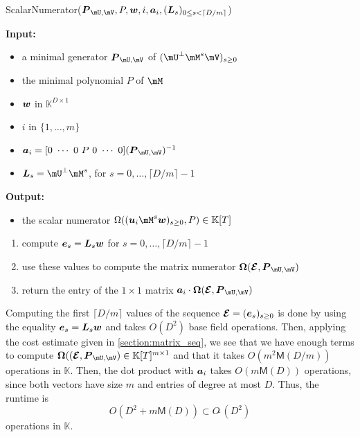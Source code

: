 \documentclass[12pt]{article}
\newcommand{\mat}[1]{\bm{\MakeUppercase{#1}}} %
\newcommand{\row}[1]{\bm{\MakeLowercase{#1}}} %
\newcommand{\col}[1]{\bm{\MakeLowercase{#1}}} %
\newcommand{\softO}[1]{O{\tilde{~}}(#1)} %
\newcommand{\minpoly}{P}
\def\M {\ensuremath{\mathsf{M}}}
\def\K{\mathbb{K}}
\def\K {\ensuremath{\mathbb{K}}}
\begin{document}
\begin{algorithm}[H]
	\caption{ScalarNumerator($\mat{P}_{\mU,\mV}, \minpoly, \row{w}, i, \row{a}_i,(\mat{L}_s)_{0 \le s < \lceil D/m\rceil}$)}
	{\bf Input:} \vspace{-0.5em}
	\begin{itemize}
		\item a minimal generator $\mat{P}_{\mU,\mV}$ of $(\mU^\perp \mM^s \mV)_{s \ge 0}$
    \item the minimal polynomial $P$ of $\mM$
    \item $\row{w}$ in $\K^{D \times 1}$
    \item $i$ in $\{1,\dots,m\}$
    \item $\row{a}_i =  [0~\cdots~0~\minpoly~0~\cdots~0]  (\mat{P}_{\mU,\mV})^{-1} $
		\item $\mat{L}_s = \mU^\perp \mM^s$, for $s=0,\dots,\lceil D/m\rceil-1$
	\end{itemize}
	{\bf Output:}  \vspace{-0.5em}
        \begin{itemize}
        \item         the scalar numerator $\Omega((\row{u}_i \mM^s \col{w})_{s \ge 0}, \minpoly) \in \K[T]$
        \end{itemize}
        \begin{enumerate}[{\bf 1.}]
        \item compute $\col{E}_s = \mat{L}_s \col{w}$ for $s=0,\dots,\lceil D/m\rceil-1$
        \item use these values to compute the matrix numerator $ \mat{\Omega}(\mat{\mathcal{E}}, \mat{P}_{\mU,\mV})$ 
        \item return the entry of the $1 \times 1$ matrix $\row{a}_i\cdot  \mat{\Omega}(\mat{\mathcal{E}}, \mat{P}_{\mU,\mV})$ 
        \end{enumerate}
	\label{algo:scalar_numerator}
\end{algorithm}

Computing the first $\lceil D/m \rceil$ values of the sequence
$\mat{\mathcal{E}}=(\col{e}_s)_{s \ge 0}$ is done by using the
equality $\col{E}_s = \mat{L}_s \col{w}$ and takes $O(D^2)$ base field
operations. Then, applying the cost estimate given in
\cref{section:matrix_seq}, we see that we have enough terms to compute
$\mat{\Omega}( (\mat{\mathcal{E}}, \mat{P}_{\mU,\mV}) \in \K[T]^{m
  \times 1}$ and that it takes $O(m^2 \M(D/m))$ operations in
$\K$. Then, the dot product with $\row{a}_i$ takes $O(m \M(D))$
operations, since both vectors have size $m$ and entries of degree at
most $D$. Thus, the runtime is 
$$O(D^2 + m \M(D)) \subset \softO{D^2}$$
operations in $\K$.
\end{document}
